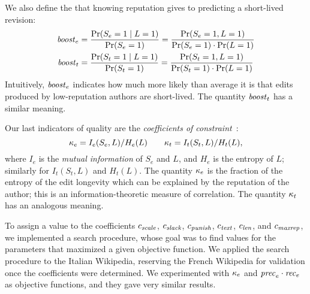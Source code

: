 We also define the  that knowing reputation gives
to predicting a short-lived revision: 
%
\begin{align*}
  {\text{\textit{boost}}}_e & = \frac{\Pr(S_e=1 \mid L=1)}{\Pr(S_e=1)}
            = \frac{\Pr(S_e=1 , L=1)}{\Pr(S_e=1)\cdot\Pr(L=1)} \\
  {\text{\textit{boost}}}_t & = \frac{\Pr(S_t=1 \mid L=1)}{\Pr(S_t=1)}
            = \frac{\Pr(S_t=1 , L=1)}{\Pr(S_t=1)\cdot\Pr(L=1)}
\end{align*}
%
Intuitively, ${\text{\textit{boost}}}_e$ indicates how much more likely than average
it is that edits produced by low-reputation authors are short-lived.
The quantity ${\text{\textit{boost}}}_t$ has a similar meaning. 

Our last indicators of quality are the
\textit{coefficients of constraint}~\cite{Coombs1970,Cover1991}:
\[ 
  \kappa_e = I_e(S_e,L) / H_e(L)
  \qquad 
  \kappa_t = I_t(S_t,L) / H_t(L),
\]
where $I_e$ is the {\em mutual information\/} of $S_e$ and $L$,
and $H_e$ is the entropy of $L$;
similarly for $I_t(S_t,L)$ and $H_t(L)$.
The quantity $\kappa_e$ is the fraction of the entropy of the
edit longevity which can be explained by the reputation of the author; 
this is an information-theoretic measure of correlation. 
The quantity $\kappa_t$ has an analogous meaning. 

To assign a value to the coefficients ${c_{{\text{\textit{scale}}}}}$, ${c_{{\text{\textit{slack}}}}}$,
${c_{{\text{\textit{punish}}}}}$, ${c_{{\text{\textit{text}}}}}$, ${c_{{\text{\textit{len}}}}}$, and ${c_{{\text{\textit{maxrep}}}}}$, 
we implemented a search procedure, whose goal was to find values for
the parameters that maximized a given objective function. 
We applied the search procedure to the Italian Wikipedia, reserving
the French Wikipedia for validation once the coefficients were
determined. 
We experimented with $\kappa_e$ and ${\text{\textit{prec}}}_e \cdot {\text{\textit{rec}}}_e$
as objective functions, and they gave very similar results. 

